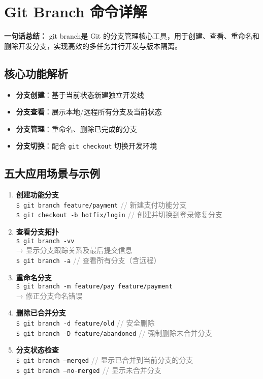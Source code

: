 \section{Git Branch 命令详解}
\textbf{一句话总结：}  
git branch是 Git 的分支管理核心工具，用于创建、查看、重命名和删除开发分支，实现高效的多任务并行开发与版本隔离。
\subsection{核心功能解析}
\begin{itemize}[leftmargin=*, nosep]
    \item \textbf{分支创建}：基于当前状态新建独立开发线
    \item \textbf{分支查看}：展示本地/远程所有分支及当前状态
    \item \textbf{分支管理}：重命名、删除已完成的分支
    \item \textbf{分支切换}：配合 \texttt{git checkout} 切换开发环境
\end{itemize}

\subsection{五大应用场景与示例}
\begin{enumerate}[leftmargin=*, nosep]
    \item \textbf{创建功能分支} \\
    \texttt{\$ git branch feature/payment} \quad \textcolor{gray}{// 新建支付功能分支} \\
    \texttt{\$ git checkout -b hotfix/login} \quad \textcolor{gray}{// 创建并切换到登录修复分支}
    
    \item \textbf{查看分支拓扑} \\
    \texttt{\$ git branch -vv} \\
    \textcolor{gray}{→ 显示分支跟踪关系及最后提交信息} \\
    \texttt{\$ git branch -a} \quad \textcolor{gray}{// 查看所有分支（含远程）}
    
    \item \textbf{重命名分支} \\
    \texttt{\$ git branch -m feature/pay feature/payment} \\
    \textcolor{gray}{→ 修正分支命名错误}
    
    \item \textbf{删除已合并分支} \\
    \texttt{\$ git branch -d feature/old} \quad \textcolor{gray}{// 安全删除} \\
    \texttt{\$ git branch -D feature/abandoned} \quad \textcolor{gray}{// 强制删除未合并分支}
    
    \item \textbf{分支状态检查} \\
    \texttt{\$ git branch --merged} \quad \textcolor{gray}{// 显示已合并到当前分支的分支} \\
    \texttt{\$ git branch --no-merged} \quad \textcolor{gray}{// 显示未合并分支}
\end{enumerate}

